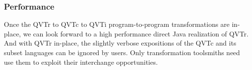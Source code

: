 \subsubsection{Performance}

Once the QVTr to QVTc to QVTi program-to-program transformations are in-place, we can look forward to a high performance direct Java realization of QVTr. And with QVTr in-place, the slightly verbose expositions of the QVTc and its subset languages can be ignored by users. Only transformation toolsmiths need use them to exploit their interchange opportunities.





